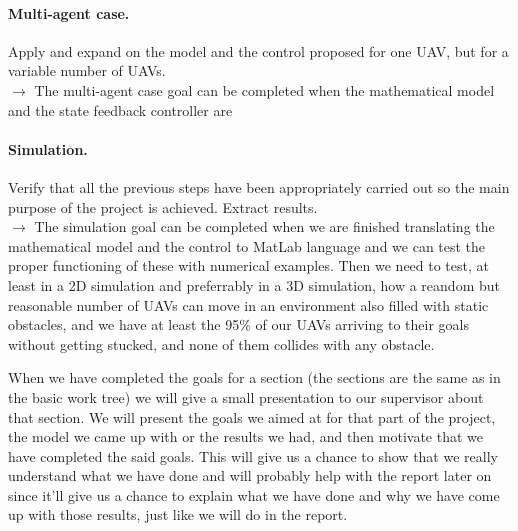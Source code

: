 \documentclass{article}
\begin{document}
		\paragraph{Multi-agent case.} Apply and expand  on the model and the control proposed for one UAV, but for a variable number of UAVs.\\
		$\rightarrow$ The multi-agent case goal can be completed when the mathematical model and the state feedback controller are %
		
		\paragraph{Simulation.} Verify that all the previous steps have been appropriately carried out so the main purpose of the project is achieved. Extract results. \\
		$\rightarrow$ The simulation goal can be completed when we are finished translating the mathematical model and the control to MatLab language and we can test the proper functioning of these with numerical examples. Then we need to test, at least in a 2D simulation and preferrably in a 3D simulation, how a reandom but reasonable number of UAVs can move in an environment also filled with static obstacles, and we have at least the 95\% of our UAVs arriving to their goals without getting stucked, and none of them collides with any obstacle. %

		\vspace{2em}
		 When we have completed the goals for a section (the sections are the same as in the basic work tree) we will give a small presentation to our supervisor about that section. We will present the goals we aimed at for that part of the project, the model we came up with or the results we had, and then motivate that we have completed the said goals. This will give us a chance to show that we really understand what we have done and will probably help with the report later on since it'll give us a chance to explain what we have done and why we have come up with those results, just like we will do in the report.  
\end{document}
